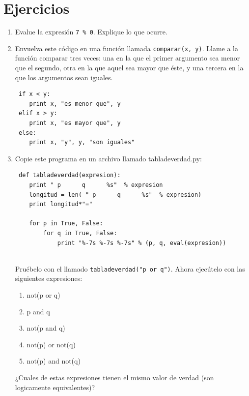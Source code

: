 \section{Ejercicios}
\begin{enumerate}

 \item Evalue la expresión \verb+7 % 0+. Explique lo que ocurre.
 
 \item Envuelva este código en una función llamada \verb+comparar(x, y)+. Llame a la función comparar tres veces: 
 una en la que el primer argumento sea menor que el segundo, otra en la que aquel sea mayor que éste, y 
 una tercera en la que los argumentos sean iguales.
 \begin{verbatim} 
 if x < y:
    print x, "es menor que", y
 elif x > y:
    print x, "es mayor que", y
 else:
    print x, "y", y, "son iguales"
 \end{verbatim}
 
 \item Copie este programa en un archivo llamado tabladeverdad.py:
 \begin{verbatim}
 def tabladeverdad(expresion):
    print " p      q      %s"  % expresion
    longitud = len( " p      q      %s"  % expresion)
    print longitud*"="

    for p in True, False:
        for q in True, False:
            print "%-7s %-7s %-7s" % (p, q, eval(expresion))
 
 \end{verbatim}
 Pruébelo con el llamado \verb+tabladeverdad("p or q")+. Ahora ejecútelo con las siguientes expresiones:
 \begin{enumerate}
 \item not(p or q)
 \item p and q
 \item not(p and q)
 \item not(p) or not(q)
 \item not(p) and not(q)
 \end{enumerate}
 
 ¿Cuales de estas expresiones tienen el mismo valor de verdad (son logicamente equivalentes)?
 
 
 
\end{enumerate}


